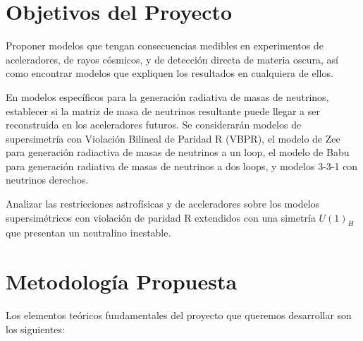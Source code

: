 \documentclass[11pt]{article}
\begin{document}
\section{ Objetivos del Proyecto }

Proponer modelos que tengan consecuencias medibles en experimentos de aceleradores, de rayos cósmicos, y de detección directa de materia oscura, así como encontrar modelos que expliquen los resultados en cualquiera de ellos.

En modelos específicos para la generación radiativa de masas de neutrinos, establecer si la matriz de masa de neutrinos resultante puede llegar a ser reconstruida en los aceleradores futuros. Se considerarán modelos de supersimetría con Violación Bilineal de Paridad R (VBPR), el modelo de Zee para generación radiactiva de masas
de neutrinos a un loop, el modelo de Babu para generación radiativa de
masas de neutrinos a dos loops, y modelos 3-3-1 con neutrinos
derechos.

Analizar las restricciones astrofísicas y de aceleradores sobre los modelos supersimétricos
con violación de paridad R extendidos con una simetría $U(1)_H$ que presentan un neutralino inestable.

\section{ Metodología Propuesta }

Los elementos teóricos fundamentales del proyecto que queremos desarrollar
son los siguientes:
\end{document}
